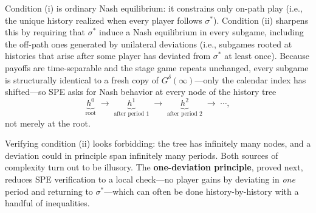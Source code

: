 
Condition (i) is ordinary Nash equilibrium: it constrains only on-path play (i.e., the unique history realized when every player follows $\sigma^*$). Condition (ii) sharpens this by requiring that $\sigma^*$ induce a Nash equilibrium in every subgame, including the off-path ones generated by unilateral deviations (i.e., subgames rooted at histories that arise after some player has deviated from $\sigma^*$ at least once). Because payoffs are time-separable and the stage game repeats unchanged, every subgame is structurally identical to a fresh copy of $G^\delta(\infty)$---only the calendar index has shifted---so SPE asks for Nash behavior at every node of the history tree
\[
\underbrace{h^0}_{\text{root}} \;\longrightarrow\; \underbrace{h^1}_{\text{after period 1}} \;\longrightarrow\; \underbrace{h^2}_{\text{after period 2}} \;\longrightarrow\; \cdots,
\]
not merely at the root.

Verifying condition (ii) looks forbidding: the tree has infinitely many nodes, and a deviation could in principle span infinitely many periods. Both sources of complexity turn out to be illusory. The \textbf{one-deviation principle}, proved next, reduces SPE verification to a local check---no player gains by deviating in \emph{one} period and returning to $\sigma^*$---which can often be done history-by-history with a handful of inequalities.

